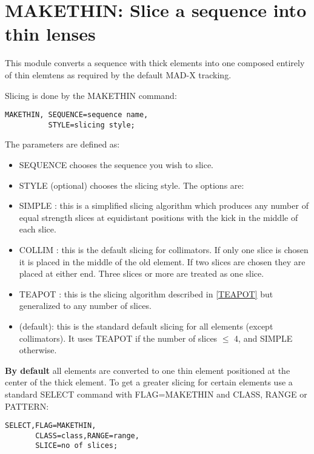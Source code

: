  
\chapter{MAKETHIN: Slice a sequence into thin lenses}

This module converts a sequence with thick elements into one composed
entirely of thin elemtens as required by the default MAD-X tracking.  
 
Slicing is done by the MAKETHIN command: 
\begin{verbatim}
MAKETHIN, SEQUENCE=sequence name,
          STYLE=slicing style;
\end{verbatim} 

The parameters are defined as: 
\begin{itemize}
   \item SEQUENCE chooses the sequence you wish to slice. 
   \item STYLE (optional) chooses the slicing style. The options are:   
   \item SIMPLE : this is a simplified slicing algorithm which produces
     any number of equal strength slices at equidistant positions with
     the kick in the middle of each slice.      
   \item COLLIM : this is the default slicing for collimators. If only
     one slice is  chosen it is placed in the middle of the old
     element. If two slices are chosen they  are placed at either
     end. Three slices or more are treated as one slice.      
   \item TEAPOT : this is the slicing algorithm described in
     \href{../Introduction/bibliography.html#TEAPOT}{[TEAPOT]} but
     generalized to any number of slices.      
   \item      (default): this is the standard default slicing for all
     elements (except collimators). It uses TEAPOT if the number of
     slices $\leq$ 4, and SIMPLE otherwise.     
\end{itemize}
\textbf{By default} all elements are converted to one thin element
positioned at the center of  the thick element. To get a greater slicing
for certain elements use a standard SELECT command with FLAG=MAKETHIN
and  CLASS, RANGE or PATTERN:  

\begin{verbatim}
SELECT,FLAG=MAKETHIN,
       CLASS=class,RANGE=range,
       SLICE=no of slices;
\end{verbatim}

